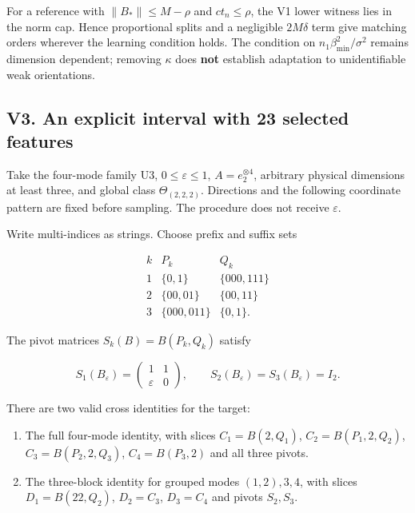 \documentclass[
  11pt,
]{article}
\providecommand{\tightlist}{%
  \setlength{\itemsep}{0pt}\setlength{\parskip}{0pt}}
\begin{document}
For a reference with \(\|B_*\|\le M-\rho\) and \(ct_n\le\rho\), the V1
lower witness lies in the norm cap. Hence proportional splits and a
negligible \(2M\delta\) term give matching orders wherever the learning
condition holds. The condition on \(n_1\beta_{\min}^2/\sigma^2\) remains
dimension dependent; removing \(\kappa\) does \textbf{not} establish
adaptation to unidentifiable weak orientations.

\subsection{V3. An explicit interval with 23 selected
features}\label{v3.-an-explicit-interval-with-23-selected-features}

Take the four-mode family U3, \(0\le\varepsilon\le1\),
\(A=e_2^{\otimes4}\), arbitrary physical dimensions at least three, and
global class \(\Theta_{(2,2,2)}\). Directions and the following
coordinate pattern are fixed before sampling. The procedure does not
receive \(\varepsilon\).

Write multi-indices as strings. Choose prefix and suffix sets

\[\begin{array}{c|c|c}
k&P_k&Q_k\\\hline
1&\{0,1\}&\{000,111\}\\
2&\{00,01\}&\{00,11\}\\
3&\{000,011\}&\{0,1\}.
\end{array}\]

The pivot matrices \(S_k(B)=B(P_k,Q_k)\) satisfy

\[S_1(B_\varepsilon)=
\begin{pmatrix}1&1\\\varepsilon&0\end{pmatrix},\qquad
S_2(B_\varepsilon)=S_3(B_\varepsilon)=I_2.\]

There are two valid cross identities for the target:

\begin{enumerate}
\def\labelenumi{\arabic{enumi}.}
\tightlist
\item
  The full four-mode identity, with slices \(C_1=B(2,Q_1)\),
  \(C_2=B(P_1,2,Q_2)\), \(C_3=B(P_2,2,Q_3)\), \(C_4=B(P_3,2)\) and all
  three pivots.
\item
  The three-block identity for grouped modes \((1,2),3,4\), with slices
  \(D_1=B(22,Q_2)\), \(D_2=C_3\), \(D_3=C_4\) and pivots \(S_2,S_3\).
\end{enumerate}
\end{document}
